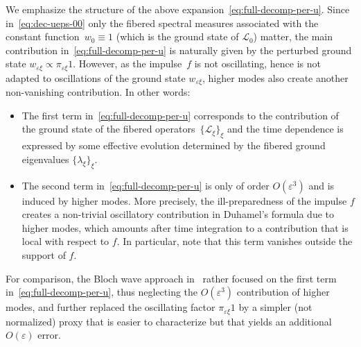 \documentclass[JEP,XML,SOM,Unicode,published]{cedram}
\theoremstyle{plain}
\theoremstyle{definition}
\numberwithin{equation}{section}
\newcommand{\e}{\varepsilon}
\newcommand{\Lc}{\mathcal{L}}
\begin{document}
We emphasize the structure of the above expansion~\eqref{eq:full-decomp-per-u}.
Since in~\eqref{eq:dec-ueps-00} only the fibered spectral measures associated with the constant function~$w_0\equiv1$ {(which is the ground state of $\Lc_0$)} matter, the main contribution in~\eqref{eq:full-decomp-per-u} is naturally given by the perturbed ground state $w_{\e\xi}\propto\pi_{\e\xi}1$. However, as the impulse~$f$ is not oscillating, hence is not adapted to oscillations of the ground state $w_{\e\xi}$, higher modes also create another non-vanishing contribution. In other words:
\begin{itemize}
\item The first term in~\eqref{eq:full-decomp-per-u} corresponds to the contribution of the ground state of the fibered operators~$\{\Lc_\xi\}_\xi$ and the time dependence is expressed by some effective evolution determined by the fibered ground eigenvalues $\{\lambda_\xi\}_\xi$.
\item The second term in~\eqref{eq:full-decomp-per-u} is only of order $O(\e^3)$ and is induced by higher modes. More precisely, the ill-preparedness of the impulse $f$ creates a non-trivial oscillatory contribution in Duhamel's formula due to higher modes, which amounts after time integration to a contribution that is local with respect to $f$.
In particular, note that this term vanishes outside the support of $f$.
\end{itemize}
For comparison, the Bloch wave approach in~\cite{Lamacz-11,DLS-14,DLS-15,BG} rather focused on the first term in~\eqref{eq:full-decomp-per-u}, thus neglecting the $O(\e^3)$ contribution of higher modes, and further replaced the oscillating factor $\pi_{\e\xi}1$ by a simpler (not normalized) proxy that is easier to characterize but that yields an additional $O(\e)$ error.
\end{document}
